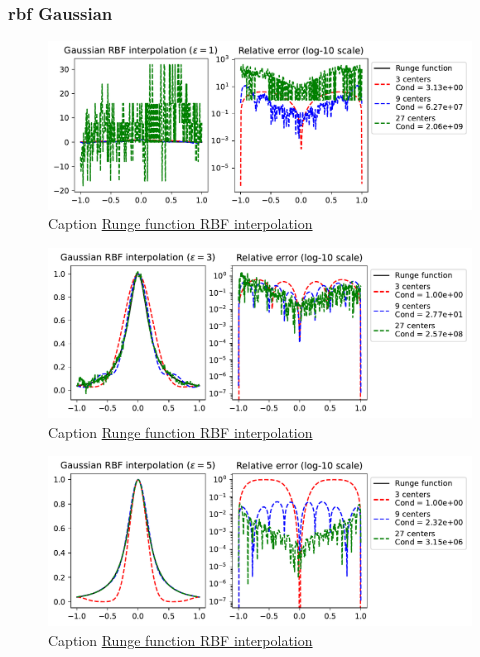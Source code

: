 \documentclass[12pt]{report} %
\begin{document}
\subsubsection{rbf Gaussian}

\begin{figure}[ht]
  \centering
  \includegraphics[width=\textwidth]{imagenes/rbf_interpolation/rbf_runge_1.pdf}
  \caption{Caption \href{https://github.com/heqro/tfm-experiments/blob/main/introductory_notebooks/rbf_interpolation/runge_phs.ipynb}{Runge function RBF interpolation}}
  \label{fig:rbf-runge-phenomenon-eps-1}
\end{figure}

\begin{figure}[ht]
  \centering
  \includegraphics[width=\textwidth]{imagenes/rbf_interpolation/rbf_runge_3.pdf}
  \caption{Caption \href{https://github.com/heqro/tfm-experiments/blob/main/introductory_notebooks/rbf_interpolation/runge_phs.ipynb}{Runge function RBF interpolation}}
  \label{fig:rbf-runge-phenomenon-eps-3}
\end{figure}

\begin{figure}[ht]
  \centering
  \includegraphics[width=\textwidth]{imagenes/rbf_interpolation/rbf_runge_5.pdf}
  \caption{Caption \href{https://github.com/heqro/tfm-experiments/blob/main/introductory_notebooks/rbf_interpolation/runge_phs.ipynb}{Runge function RBF interpolation}}
  \label{fig:rbf-runge-phenomenon-eps-5}
\end{figure}
\end{document}
